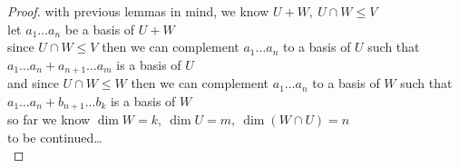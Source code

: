 \documentclass[a4paper,12pt]{article}
\begin{document}
\begin{definition}
\begin{lemma}
\begin{proof}
with previous lemmas in mind, we know \(U + W,\ U \cap W \leq V\)\\
let \(a_1\ldots a_n\) be a basis of \(U + W\)\\
since \(U \cap W \leq V\) then we can complement \(a_1\ldots a_n\) to a basis of \(U\) such that \(a_1\ldots a_n + a_{n+1} \ldots a_m\) is a basis of \(U\)\\
and since \(U \cap W \leq W\) then we can complement \(a_1\ldots a_n\) to a basis of \(W\) such that \(a_1\ldots a_n + b_{n+1} \ldots b_{k}\) is a basis of \(W\)\\
so far we know \(\dim W = k,\ \dim U = m,\ \dim(W \cap U) = n\)\\
to be continued\ldots{}\\
\end{proof}
\end{lemma}
\end{definition}
\end{document}
